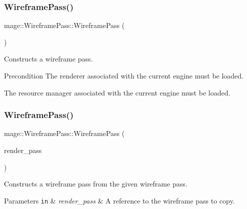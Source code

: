 \subsubsection{\texorpdfstring{Wireframe\+Pass()}{WireframePass()}\hspace{0.1cm}{\footnotesize\ttfamily [1/3]}}
{\footnotesize\ttfamily mage\+::\+Wireframe\+Pass\+::\+Wireframe\+Pass (\begin{DoxyParamCaption}{ }\end{DoxyParamCaption})}

Constructs a wireframe pass.

\begin{DoxyPrecond}{Precondition}
The renderer associated with the current engine must be loaded. 

The resource manager associated with the current engine must be loaded. 
\end{DoxyPrecond}
\hypertarget{classmage_1_1_wireframe_pass_a3e070108925c2ef3b4feaa29dbf605f2}{}\label{classmage_1_1_wireframe_pass_a3e070108925c2ef3b4feaa29dbf605f2} 
\subsubsection{\texorpdfstring{Wireframe\+Pass()}{WireframePass()}\hspace{0.1cm}{\footnotesize\ttfamily [2/3]}}
{\footnotesize\ttfamily mage\+::\+Wireframe\+Pass\+::\+Wireframe\+Pass (\begin{DoxyParamCaption}\item[{const \hyperlink{classmage_1_1_wireframe_pass}{Wireframe\+Pass} \&}]{render\+\_\+pass }\end{DoxyParamCaption})\hspace{0.3cm}{\ttfamily [delete]}}

Constructs a wireframe pass from the given wireframe pass.


\begin{DoxyParams}[1]{Parameters}
\mbox{\tt in}  & {\em render\+\_\+pass} & A reference to the wireframe pass to copy. \\
\hline
\end{DoxyParams}
\hypertarget{classmage_1_1_wireframe_pass_a08631bc9b341bed85b1b14b99affb1f0}{}\label{classmage_1_1_wireframe_pass_a08631bc9b341bed85b1b14b99affb1f0} 
